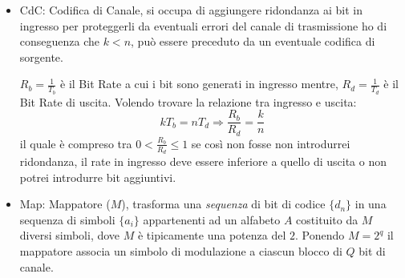     \begin{itemize}
        \item {CdC: Codifica di Canale, si occupa di aggiungere ridondanza ai bit in ingresso per proteggerli da eventuali errori del canale di trasmissione ho di
            conseguenza che $k<n$, può essere preceduto da un eventuale codifica di sorgente. 
            \begin{figure}[H]
                \centering 
            \end{figure}
            $R_b = \frac{1}{T_b}$ è il Bit Rate a cui i bit sono generati in ingresso mentre, $R_d = \frac{1}{T_d}$ è il Bit Rate di uscita. Volendo trovare la relazione tra ingresso e uscita:
            \[
                kT_b = nT_d \Rightarrow \frac{R_b}{R_d} = \frac{k}{n}     
            \] 
            il quale è compreso tra $0<\frac{R_b}{R_d}\leq 1$ se così non fosse non introdurrei ridondanza, il rate in ingresso deve essere inferiore a quello di uscita o non 
            potrei introdurre bit aggiuntivi.
        }
        \item {Map: Mappatore ($M$), trasforma una \emph{sequenza} di bit di codice $\{d_n\}$ in una sequenza di simboli $\{a_i\}$ appartenenti ad un alfabeto $A$ costituito
            da $M$ diversi simboli, dove $M$ è tipicamente una potenza del $2$. Ponendo $M=2^q$ il mappatore associa un simbolo di modulazione a ciascun blocco di $Q$ bit di canale. 
            \begin{figure}[H]
                \centering 
                \begin{tikzpicture}[
                    node distance=3cm,
                    >=latex
                    ]
        

\end{tikzpicture}
\end{figure}}
\end{itemize}

